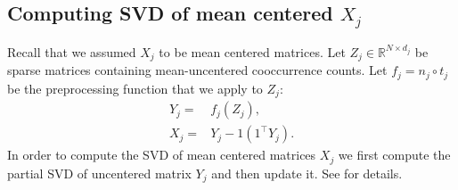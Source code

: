 \documentclass[11pt]{article}
\newcommand{\remove}[1]{}
\begin{document}
\subsection{Computing SVD of mean centered $X_j$}
\label{ssec:svdmc}
Recall that we assumed $X_j$ to be mean centered matrices. Let $Z_j
\in \mathbb{R}^{N \times d_j}$ be sparse matrices containing
mean-uncentered cooccurrence counts. Let $f_j = n_j \circ t_j $ be the preprocessing
function that we apply to $Z_j$: 
\begin{align}
  Y_j =& f_j (Z_j), \\
  X_j =& Y_j - 1 (1^\top Y_j).
\end{align}
In order to compute the SVD of mean centered matrices $X_j$ we first
compute the partial SVD of uncentered 
matrix $Y_j$ and then update it. See \cite{brand2006fast} for details.
\remove{We experimented with representations created from the
uncentered matrices $Y_j$ and found that they performed as well as 
the mean centered versions but we would not mention them further since
it is computationally efficient to follow the principled approach. We
note, however, that even the method of mean-centering the SVD
produces an approximation.}
\end{document}
